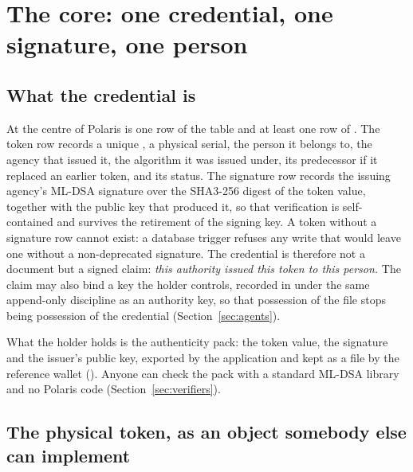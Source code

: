 \section{The core: one credential, one signature, one person}
\label{sec:core}


\subsection{What the credential is}

At the centre of Polaris is one row of the table  and at least one row of
. The token row records a unique , a physical serial, the
person it belongs to, the agency that issued it, the algorithm it was issued under, its predecessor if
it replaced an earlier token, and its status. The signature row records the issuing agency's ML-DSA
signature over the SHA3-256 digest of the token value, together with the public key that produced
it, so that verification is self-contained and survives the retirement of the signing key. A token
without a signature row cannot exist: a database trigger refuses any write that would leave one
without a non-deprecated signature. The credential is therefore not a document but a signed claim:
\emph{this authority issued this token to this person.} The claim may also bind a
key the holder controls, recorded in  under the same append-only discipline
as an authority key, so that possession of the file stops being possession of the credential
(Section~\ref{sec:agents}). \sImpl

What the holder holds is the authenticity pack: the token value, the signature and the issuer's
public key, exported by the application and kept as a file by the reference wallet
(). Anyone can check the pack with a standard ML-DSA library and no
Polaris code (Section~\ref{sec:verifiers}).

\subsection{The physical token, as an object somebody else can implement}

